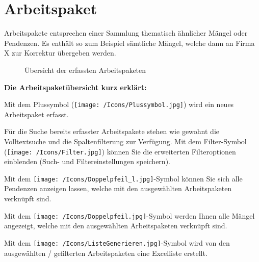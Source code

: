 \pagebreak
\section{Arbeitspaket}

Arbeitspakete entsprechen einer Sammlung thematisch ähnlicher Mängel oder Pendenzen. Es enthält so zum Beispiel sämtliche Mängel, welche dann an Firma X zur Korrektur übergeben werden.

\begin{figure}[H]
\caption{Übersicht der erfassten Arbeitspaketen}
\end{figure}

\textbf{Die Arbeitspaketübersicht kurz erklärt:}

\vspace{\baselineskip}

\begin{compactitem}
	\item Mit dem Plussymbol (\texttt{[image: /Icons/Plussymbol.jpg]}) wird ein neues Arbeitspaket erfasst. 
	\item Für die Suche bereits erfasster Arbeitspakete stehen wie gewohnt die Volltextsuche und die Spaltenfilterung zur Verfügung. Mit dem Filter-Symbol (\texttt{[image: /Icons/Filter.jpg]}) können Sie die erweiterten Filteroptionen einblenden (Such- und Filtereinstellungen speichern).
	\item Mit dem \texttt{[image: /Icons/Doppelpfeil\_l.jpg]}-Symbol können Sie sich alle Pendenzen anzeigen lassen, welche mit den ausgewählten Arbeitspaketen verknüpft sind.
	\item Mit dem \texttt{[image: /Icons/Doppelpfeil.jpg]}-Symbol werden Ihnen alle Mängel angezeigt, welche mit den ausgewählten Arbeitspaketen verknüpft sind.
	\item Mit dem \texttt{[image: /Icons/ListeGenerieren.jpg]}-Symbol wird von den ausgewählten / gefilterten Arbeitspaketen eine Excelliste erstellt.
\end{compactitem}


